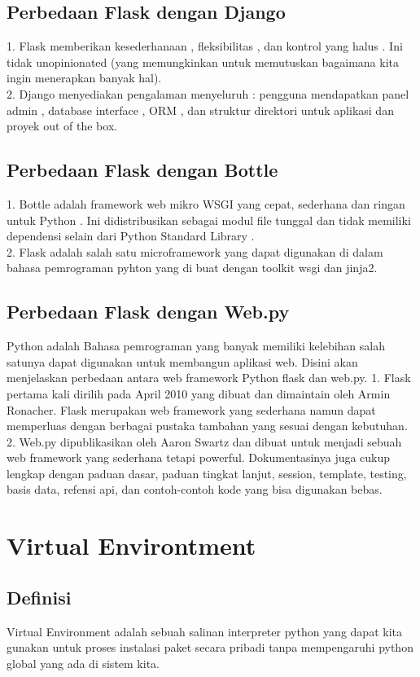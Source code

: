 \documentclass[12pt,a4paper]{article}
\begin{document}
\subsection{Perbedaan Flask dengan Django}
1.	Flask memberikan kesederhanaan , fleksibilitas , dan kontrol yang halus . Ini tidak unopinionated (yang memungkinkan untuk memutuskan bagaimana kita ingin menerapkan banyak hal).\\
2.  Django menyediakan pengalaman menyeluruh : pengguna mendapatkan panel admin , database interface , ORM , dan struktur direktori untuk aplikasi dan proyek out of the box.
\subsection{Perbedaan Flask dengan Bottle}
1.	Bottle adalah framework web mikro WSGI yang cepat, sederhana dan ringan untuk Python . Ini didistribusikan sebagai modul file tunggal dan tidak memiliki dependensi selain dari Python Standard Library .\\
2.	Flask adalah salah satu microframework yang dapat digunakan di dalam bahasa pemrograman pyhton yang di buat dengan toolkit wsgi dan jinja2.
\subsection{Perbedaan Flask dengan Web.py}
Python adalah Bahasa pemrograman yang banyak memiliki kelebihan salah satunya dapat digunakan untuk membangun aplikasi web. Disini akan menjelaskan perbedaan antara web framework Python flask dan web.py.
1.	Flask pertama kali dirilih pada April 2010 yang dibuat dan dimaintain oleh Armin Ronacher. Flask merupakan web framework yang sederhana namun dapat memperluas dengan berbagai pustaka tambahan yang sesuai dengan kebutuhan.
2.	Web.py dipublikasikan oleh Aaron Swartz dan dibuat untuk menjadi sebuah web framework yang sederhana tetapi powerful. Dokumentasinya juga cukup lengkap dengan paduan dasar, paduan tingkat lanjut, session, template, testing, basis data, refensi api, dan contoh-contoh kode yang bisa digunakan bebas.

\section{Virtual Environtment}
\subsection{Definisi}
\hspace{1cm} Virtual Environment adalah sebuah salinan interpreter python yang dapat kita gunakan untuk proses instalasi paket secara pribadi tanpa mempengaruhi python global yang ada di sistem kita.
\end{document}
